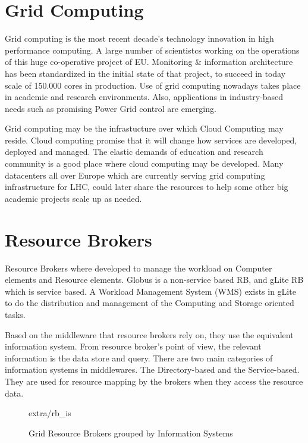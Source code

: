 \section{Grid Computing}
Grid computing \cite{li2005grid} is the most recent decade's technology innovation in high performance computing. A large number of scientistcs working on the operations of this huge co-operative project of EU. Monitoring \& information architecture \cite{fisher2002datagrid} has been standardized in the initial state of that project, to succeed in today scale of 150.000 cores in production. Use of grid computing nowadays takes place in academic and research environments. Also, applications in industry-based needs such as promising Power Grid control \cite{Taylor2006} are emerging.

Grid computing may be the infrastucture over which Cloud Computing may reside. Cloud computing promise that it will change how services are developed, deployed and managed. The elastic demands of education and research community is a good place where cloud computing may be developed. Many datacenters all over Europe which are currently serving grid computing infrastructure for LHC, could later share the resources to help some other big academic projects scale up as needed.

\section{Resource Brokers}
Resource Brokers \cite{Kertesz06ataxonomy} where developed to manage the workload on Computer elements and Resource elements. Globus is a non-service based RB, and gLite RB which is service based. A Workload Management System (WMS) exists in gLite to do the distribution and management of the Computing and Storage oriented tasks.

Based on the middleware that resource brokers rely on, they use the equivalent information system. From resource broker's point of view, the relevant information is the data store and query. There are two main categories of information systems in middlewares. The Directory-based and the Service-based. They are used for resource mapping by the brokers when they access the resource data.

\begin{figure}[h]
\begin{center}
 {extra/rb_is}
\caption{Grid Resource Brokers grouped by Information Systems\cite{Kertesz06ataxonomy}}
\end{center}
\end{figure}

